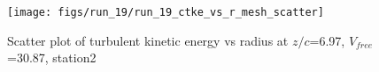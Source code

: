 \begin{figure}[H]
\centering
\texttt{[image: figs/run\_19/run\_19\_ctke\_vs\_r\_mesh\_scatter]}
\caption{Scatter plot of turbulent kinetic energy vs radius at $z/c$=6.97, $V_{free}$=30.87, station2}
\label{fig:run_19_ctke_vs_r_mesh_scatter}
\end{figure}



